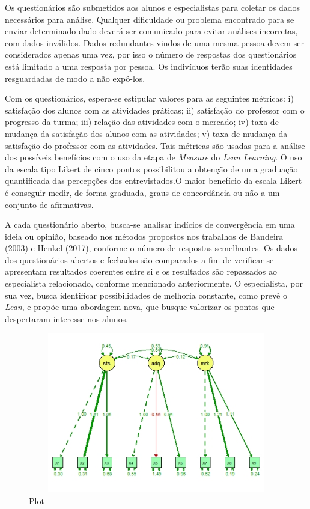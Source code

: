 Os questionários são submetidos aos alunos e especialistas para coletar os dados necessários para análise. Qualquer dificuldade ou problema encontrado para se enviar determinado dado deverá ser comunicado para evitar análises incorretas, com dados inválidos. Dados redundantes vindos de uma mesma pessoa devem ser considerados apenas uma vez, por isso o número de respostas dos questionários está limitado a uma resposta por pessoa. Os indivíduos terão suas identidades resguardadas de modo a não expô-los.%

Com os questionários, espera-se estipular valores para as seguintes métricas: i) satisfação dos alunos com as atividades práticas; ii) satisfação do professor com o progresso da turma; iii) relação das atividades com o mercado; iv) taxa de mudança da satisfação dos alunos com as atividades; v) taxa de mudança da satisfação do professor com as atividades. Tais métricas são usadas para a análise dos possíveis benefícios com o uso da etapa de \textit{Measure} do \textit{Lean Learning}. O uso da escala tipo Likert de cinco pontos possibilitou a obtenção de uma graduação quantificada das percepções dos entrevistados\cite{marconi2003fundamentos}.O maior benefício da escala Likert é conseguir medir, de forma graduada, graus de concordância ou não a um conjunto de afirmativas.

A cada questionário aberto, busca-se analisar indícios de convergência em uma ideia ou opinião, baseado nos métodos propostos nos trabalhos de Bandeira (2003) e Henkel (2017), conforme o número de respostas semelhantes. Os dados dos questionários abertos e fechados são comparados a fim de verificar se apresentam resultados coerentes entre si e os resultados são repassados ao especialista relacionado, conforme mencionado anteriormente. O especialista, por sua vez, busca identificar possibilidades de melhoria constante, como prevê o \textit{Lean}, e propõe uma abordagem nova, que busque valorizar os pontos que despertaram interesse nos alunos.

\begin{figure}
    \centering
    \includegraphics[width=13cm,height=7cm]{Imagens/RPlot.jpg}
    \caption{Plot}
    \label{fig:Plot}
\end{figure}

